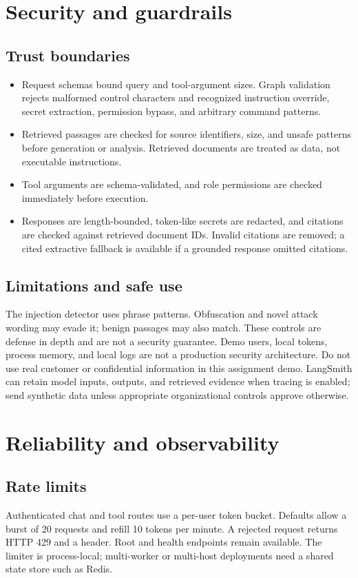 \documentclass[11pt,a4paper,oneside]{report}
\newcommand{\code}[1]{\texttt{\detokenize{#1}}}
\begin{document}
\chapter{Security and guardrails}

\section{Trust boundaries}
\begin{itemize}
  \item Request schemas bound query and tool-argument sizes. Graph validation rejects malformed control characters and recognized instruction override, secret extraction, permission bypass, and arbitrary command patterns.
  \item Retrieved passages are checked for source identifiers, size, and unsafe patterns before generation or analysis. Retrieved documents are treated as data, not executable instructions.
  \item Tool arguments are schema-validated, and role permissions are checked immediately before execution.
  \item Responses are length-bounded, token-like secrets are redacted, and citations are checked against retrieved document IDs. Invalid citations are removed; a cited extractive fallback is available if a grounded response omitted citations.
\end{itemize}

\section{Limitations and safe use}
The injection detector uses phrase patterns. Obfuscation and novel attack wording may evade it; benign passages may also match. These controls are defense in depth and are not a security guarantee. Demo users, local tokens, process memory, and local logs are not a production security architecture. Do not use real customer or confidential information in this assignment demo. LangSmith can retain model inputs, outputs, and retrieved evidence when tracing is enabled; send synthetic data unless appropriate organizational controls approve otherwise.

\chapter{Reliability and observability}

\section{Rate limits}
Authenticated chat and tool routes use a per-user token bucket. Defaults allow a burst of 20 requests and refill 10 tokens per minute. A rejected request returns HTTP 429 and a \code{Retry-After} header. Root and health endpoints remain available. The limiter is process-local; multi-worker or multi-host deployments need a shared state store such as Redis.
\end{document}
